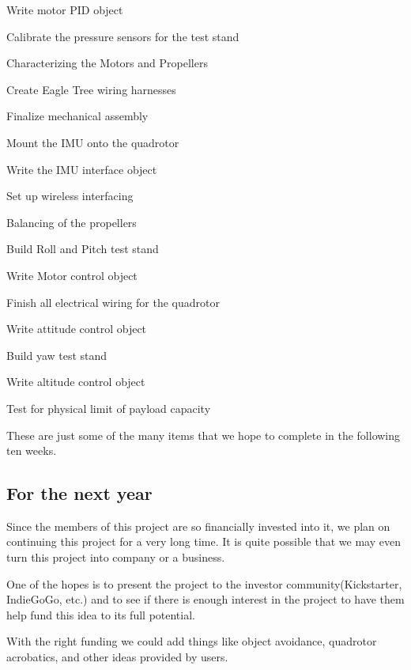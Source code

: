 \documentclass{article}
\numberwithin{equation}{section} %
\begin{document}
\begin{list}{*}{}
	\item Write motor PID object
	\item Calibrate the pressure sensors for the test stand
	\item Characterizing the Motors and Propellers
	\item Create Eagle Tree wiring harnesses
	\item Finalize mechanical assembly
	\item Mount the IMU onto the quadrotor
	\item Write the IMU interface object
	\item Set up wireless interfacing
	\item Balancing of the propellers
	\item Build Roll and Pitch test stand
	\item Write Motor control object
	\item Finish all electrical wiring for the quadrotor
	\item Write attitude control object
	\item Build yaw test stand
	\item Write altitude control object
	\item Test for physical limit of payload capacity
\end{list}
These are just some of the many items that we hope to complete in the following ten weeks.


\subsection{For the next year}
Since the members of this project are so financially invested into it, we plan on continuing this project for a very long time. It is quite possible that we may even turn this project into company or a business.

One of the hopes is to present the project to the investor community(Kickstarter, IndieGoGo, etc.) and to see if there is enough interest in the project to have them help fund this idea to its full potential.

With the right funding we could add things like object avoidance, quadrotor acrobatics, and other ideas provided by users.
\end{document}
